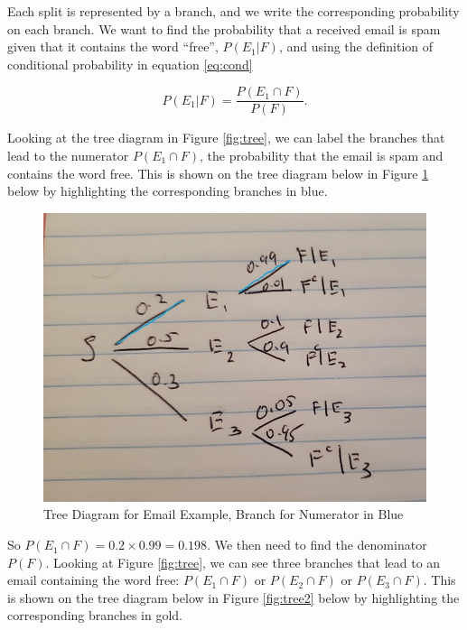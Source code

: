 \documentclass[
]{book}
\begin{document}
Each split is represented by a branch, and we write the corresponding probability on each branch. We want to find the probability that a received email is spam given that it contains the word ``free'', \(P(E_1|F)\), and using the definition of conditional probability in equation \eqref{eq:cond}

\[
P(E_1|F) = \frac{P(E_1 \cap F)}{P(F)}.
\]

Looking at the tree diagram in Figure \ref{fig:tree}, we can label the branches that lead to the numerator \(P(E_1 \cap F)\), the probability that the email is spam and contains the word free. This is shown on the tree diagram below in Figure \ref{fig:tree1} below by highlighting the corresponding branches in blue.

\begin{figure}
\centering
\includegraphics{images/02-treepath1.jpg}
\caption{\label{fig:tree1}Tree Diagram for Email Example, Branch for Numerator in Blue}
\end{figure}

So \(P(E_1 \cap F) = 0.2 \times 0.99 = 0.198\). We then need to find the denominator \(P(F)\). Looking at Figure \ref{fig:tree}, we can see three branches that lead to an email containing the word free: \(P(E_1 \cap F)\) or \(P(E_2 \cap F)\) or \(P(E_3 \cap F)\). This is shown on the tree diagram below in Figure \ref{fig:tree2} below by highlighting the corresponding branches in gold.
\end{document}
